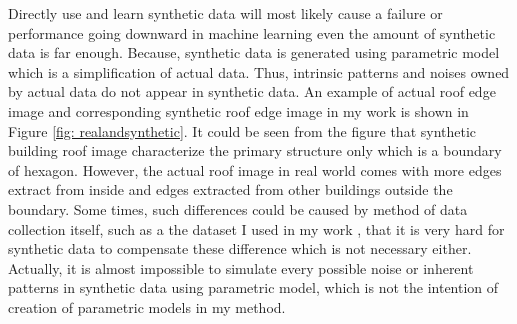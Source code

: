 \documentclass{iitthesis}
\begin{document}
Directly use and learn synthetic data will most likely cause a failure or performance going downward in machine learning even the amount of synthetic data is far enough. Because, synthetic data is generated using parametric model which is a simplification of actual data. Thus, intrinsic patterns and noises owned by actual data do not appear in synthetic data. An example of actual roof edge image and corresponding synthetic roof edge image in my work \cite{ZX14} is shown in Figure \ref{fig: realandsynthetic}. It could be seen from the figure that synthetic building roof image characterize the primary structure only which is a boundary of hexagon. However, the actual roof image in real world comes with more edges extract from inside and edges extracted from other buildings outside the boundary. Some times, such differences could be caused by method of data collection itself, such as a the dataset I used in my work \cite{ZX:14}, that it is very hard for synthetic data to compensate these difference which is not necessary either. Actually, it is almost impossible to simulate every possible noise or inherent patterns in synthetic data using parametric model, which is not the intention of creation of parametric models in my method.   
\end{document}
